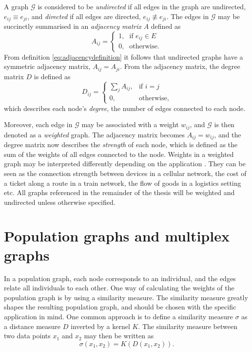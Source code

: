A graph $\mathcal{G}$ is considered to be \textit{undirected} if all edges in the graph are undirected, $e_{ij} \equiv e_{ji}$, and \textit{directed} if all edges are directed, $e_{ij} \not\equiv e_{ji}$. The edges in $\mathcal{G}$ may be succinctly summarised in an \textit{adjacency matrix} $A$ defined as
\begin{equation}
    A_{ij} = \begin{cases} \mbox{1,} & \mbox{if } e_{ij} \in E \\ \mbox{0,} & \mbox{otherwise.} \end{cases}
    \label{eq:adjacencydefinition}
\end{equation}
From definition \eqref{eq:adjacencydefinition} it follows that undirected graphs have a symmetric adjacency matrix, $A_{ij} = A_{ji}$. From the adjacency matrix, the degree matrix $D$ is defined as
\begin{equation}
    D_{ij} = \begin{cases} \sum_j A_{ij}, & \mbox{if } i = j \\ \mbox{0,} & \mbox{otherwise,} \end{cases}
    \label{eq:degreematrixdefinition}
\end{equation}
which describes each node's \textit{degree}, the number of edges connected to each node.

Moreover, each edge in $\mathcal{G}$ may be associated with a weight $w_{ij}$, and $\mathcal{G}$ is then denoted as a \textit{weighted} graph. The adjacency matrix becomes $A_{ij} = w_{ij}$, and the degree matrix now describes the \textit{strength} of each node, which is defined as the sum of the weights of all edges connected to the node. Weights in a weighted graph may be interpreted differently depending on the application \cite{adventures_in_graph_theory_chap1}. They can be seen as the connection strength between devices in a cellular network, the cost of a ticket along a route in a train network, the flow of goods in a logistics setting etc. All graphs referenced in the remainder of the thesis will be weighted and undirected unless otherwise specified.

\section{Population graphs and multiplex graphs}
\label{sec:similarity_measure}

In a population graph, each node corresponds to an individual, and the edges relate all individuals to each other. One way of calculating the weights of the population graph is by using a similarity measure. The similarity measure greatly shapes the resulting population graph, and should be chosen with the specific application in mind. One common approach is to define a similarity measure $\sigma$ as a distance measure $D$ inverted by a kernel $K$. The similarity measure between two data points $x_1$ and $x_2$ may then be written as
\begin{equation}
    \sigma(x_1,x_2) = K \left(D\left(x_1, x_2\right) \right).
    \label{eq:similarity_measure}
\end{equation}

